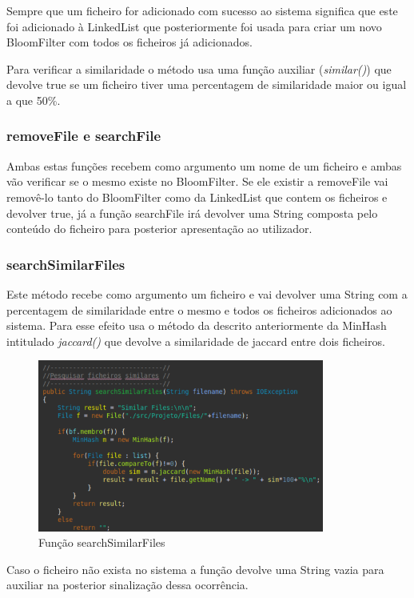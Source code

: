 \documentclass{report}
\begin{document}
 Sempre que um ficheiro for adicionado com sucesso ao sistema significa que este foi adicionado à LinkedList que posteriormente foi usada para criar um novo BloomFilter com todos os ficheiros já adicionados.
 
 Para verificar a similaridade o método usa uma função auxiliar ({\itshape similar()}) que devolve true se um ficheiro tiver uma percentagem de similaridade maior ou igual a que 50\%.
 
 
 \subsubsection{removeFile e searchFile}
 Ambas estas funções recebem como argumento um nome de um ficheiro e ambas vão verificar se o mesmo existe no BloomFilter. Se ele existir a removeFile vai removê-lo tanto do BloomFilter como da LinkedList que contem os ficheiros e devolver true, já a função searchFile irá devolver uma String composta pelo conteúdo do ficheiro para posterior apresentação ao utilizador.
 
 \subsubsection{searchSimilarFiles}
 Este método recebe como argumento um ficheiro e vai devolver uma String com a percentagem de similaridade entre o mesmo e todos os ficheiros adicionados ao sistema. Para esse efeito usa o método da descrito anteriormente da MinHash intitulado {\itshape jaccard()} que devolve a similaridade de jaccard entre dois ficheiros.

\begin{figure}[h]
\center %
\includegraphics[height=160pt]{ffd.png}
\caption{Função searchSimilarFiles}
\label{fig:Fig23}
\end{figure}

Caso o ficheiro não exista no sistema a função devolve uma String vazia para auxiliar na posterior sinalização dessa ocorrência. 
\end{document}
